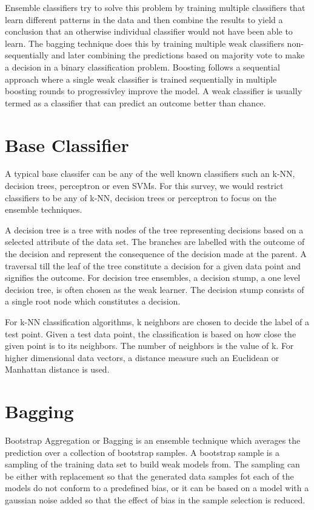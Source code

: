 \documentclass{acmtog} %
\begin{document}
Ensemble classifiers try to solve this problem by training multiple classifiers that learn different patterns in the data and then combine the results to yield a conclusion that an otherwise individual classifier would not have been able to learn. The bagging technique does this by training multiple weak classifiers non-sequentially and later combining the predictions based on majority vote to make a decision in a binary classification problem. Boosting follows a sequential approach where a single weak classifier is trained sequentially in multiple boosting rounds to progressivley improve the model. A weak classifier is usually termed as a classifier that can predict an outcome better than chance. 


\section{Base Classifier}
A typical base classifer can be any of the well known classifiers such an k-NN, decision trees, perceptron or even SVMs. For this survey, we would restrict classifiers to be any of k-NN, decision trees or perceptron to focus on the ensemble techniques. 

A decision tree is a tree with nodes of the tree representing decisions based on a selected attribute of the data set. The branches are labelled with the outcome of the decision and represent the consequence of the decision made at the parent. A traversal till the leaf of the tree constitute a decision for a given data point and signifies the outcome. For decision tree ensembles, a decision stump, a one level decision tree, is often chosen as the weak learner. The decision stump consists of a single root node which constitutes a decision. 

For k-NN classification algorithms, k neighbors are chosen to decide the label of a test point. Given a test data point, the classification is based on how close the given point is to its neighbors. The number of neighbors is the value of k. For higher dimensional data vectors, a distance measure such an Euclidean or Manhattan distance is used. 


\section{Bagging}
Bootstrap Aggregation or Bagging is an ensemble technique which averages the prediction over a collection of bootstrap samples. A bootstrap sample is a sampling of the training data set to build weak models from. The sampling can be either with replacement so that the generated data samples fot each of the models do not conform to a predefined bias, or it can be based on a model with a gaussian noise added so that the effect of bias in the sample selection is reduced.
\end{document}
